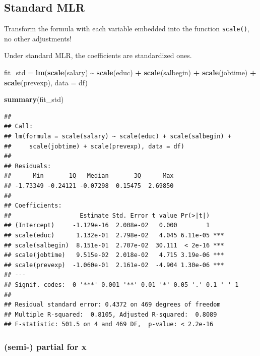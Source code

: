\documentclass[
]{ctexart}
\newenvironment{Shaded}{\begin{snugshade}}{\end{snugshade}}
\newcommand{\AttributeTok}[1]{\textcolor[rgb]{0.13,0.29,0.53}{#1}}
\newcommand{\FunctionTok}[1]{\textcolor[rgb]{0.13,0.29,0.53}{\textbf{#1}}}
\newcommand{\NormalTok}[1]{#1}
\newcommand{\OtherTok}[1]{\textcolor[rgb]{0.56,0.35,0.01}{#1}}
\newcommand{\SpecialCharTok}[1]{\textcolor[rgb]{0.81,0.36,0.00}{\textbf{#1}}}
\begin{document}
\hypertarget{standard-mlr}{%
\subsection{Standard MLR}\label{standard-mlr}}

Transform the formula with each variable embedded into the function
\texttt{scale()}, no other adjustments!

Under standard MLR, the coefficients are standardized ones.

\begin{Shaded}
\begin{Highlighting}[]
\NormalTok{fit\_std }\OtherTok{=} \FunctionTok{lm}\NormalTok{(}\FunctionTok{scale}\NormalTok{(salary) }\SpecialCharTok{\textasciitilde{}} \FunctionTok{scale}\NormalTok{(educ) }\SpecialCharTok{+} \FunctionTok{scale}\NormalTok{(salbegin) }\SpecialCharTok{+} 
               \FunctionTok{scale}\NormalTok{(jobtime) }\SpecialCharTok{+} \FunctionTok{scale}\NormalTok{(prevexp),}
             \AttributeTok{data =}\NormalTok{ df)}
\end{Highlighting}
\end{Shaded}

\begin{Shaded}
\begin{Highlighting}[]
\FunctionTok{summary}\NormalTok{(fit\_std)}
\end{Highlighting}
\end{Shaded}

\begin{verbatim}
## 
## Call:
## lm(formula = scale(salary) ~ scale(educ) + scale(salbegin) + 
##     scale(jobtime) + scale(prevexp), data = df)
## 
## Residuals:
##      Min       1Q   Median       3Q      Max 
## -1.73349 -0.24121 -0.07298  0.15475  2.69850 
## 
## Coefficients:
##                   Estimate Std. Error t value Pr(>|t|)    
## (Intercept)     -1.129e-16  2.008e-02   0.000        1    
## scale(educ)      1.132e-01  2.798e-02   4.045 6.11e-05 ***
## scale(salbegin)  8.151e-01  2.707e-02  30.111  < 2e-16 ***
## scale(jobtime)   9.515e-02  2.018e-02   4.715 3.19e-06 ***
## scale(prevexp)  -1.060e-01  2.161e-02  -4.904 1.30e-06 ***
## ---
## Signif. codes:  0 '***' 0.001 '**' 0.01 '*' 0.05 '.' 0.1 ' ' 1
## 
## Residual standard error: 0.4372 on 469 degrees of freedom
## Multiple R-squared:  0.8105, Adjusted R-squared:  0.8089 
## F-statistic: 501.5 on 4 and 469 DF,  p-value: < 2.2e-16
\end{verbatim}

\hypertarget{semi--partial-for-x}{%
\subsubsection{(semi-) partial for x}\label{semi--partial-for-x}}
\end{document}
